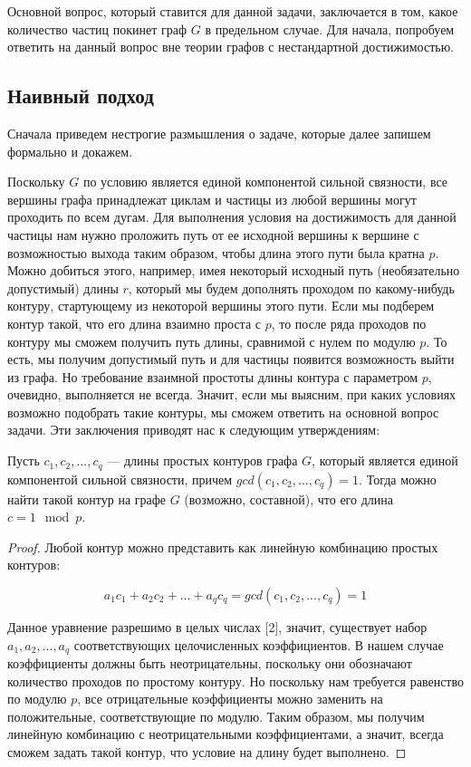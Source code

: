 Основной вопрос, который ставится для данной задачи, заключается в том, какое количество частиц покинет граф $G$ в предельном случае. Для начала, попробуем ответить на данный вопрос вне теории графов с нестандартной достижимостью. 

\subsection{Наивный подход}

Сначала приведем нестрогие размышления о задаче, которые далее запишем формально и докажем. 

Поскольку $G$ по условию является единой компонентой сильной связности, все вершины графа принадлежат циклам и частицы из любой вершины могут проходить по всем дугам. Для выполнения условия на достижимость для данной частицы нам нужно проложить путь от ее исходной вершины к вершине с возможностью выхода таким образом, чтобы длина этого пути была кратна $p$. Можно добиться этого, например, имея некоторый исходный путь (необязательно допустимый) длины $r$, который мы будем дополнять проходом по какому-нибудь контуру, стартующему из некоторой вершины этого пути. Если мы подберем контур такой, что его длина взаимно проста с $p$, то после ряда проходов по контуру мы сможем получить путь длины, сравнимой с нулем по модулю $p$. То есть, мы получим допустимый путь и для частицы появится возможность выйти из графа. Но требование взаимной простоты длины контура с параметром $p$, очевидно, выполняется не всегда. Значит, если мы выясним, при каких условиях возможно подобрать такие контуры, мы сможем ответить на основной вопрос задачи. Эти заключения приводят нас к следующим утверждениям:

\begin{lemma}
	Пусть $c_1, c_2, ... , c_q $ --- длины простых контуров графа $G$, который является единой компонентой сильной связности, причем $gcd(c_1, c_2, ... , c_q) = 1$. Тогда можно найти такой контур на графе $G$ (возможно, составной), что его длина $c = 1\mod p$.
\end{lemma}

\begin{proof}
	Любой контур можно представить как линейную комбинацию простых контуров: 
	
	\begin{equation*}
	a_1c_1 + a_2c_2 + ... + a_qc_q = gcd(c_1, c_2, ... , c_q) = 1
	\end{equation*}
	
	Данное уравнение разрешимо в целых числах [2], значит, существует набор $a_1, a_2, ... , a_q$ соответствующих целочисленных коэффициентов. В нашем случае коэффициенты должны быть неотрицательны, поскольку они обозначают количество проходов по простому контуру. Но поскольку нам требуется равенство по модулю $p$, все отрицательные коэффициенты можно заменить на положительные, соответствующие по модулю. Таким образом, мы получим линейную комбинацию с неотрицательными коэффициентами, а значит, всегда сможем задать такой контур, что условие на длину будет выполнено. 
\end{proof}

